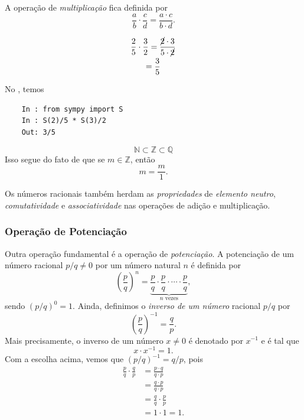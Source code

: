 A operação de \emph{multiplicação} fica definida por
\begin{equation}
  \frac{a}{b}\cdot\frac{c}{d} = \frac{a\cdot c}{b\cdot d}.
\end{equation}

\begin{ex}
  \begin{gather}
    \frac{2}{5}\cdot\frac{3}{2} = \frac{\cancel{2}\cdot 3}{5\cdot \cancel{2}} \\
    = \frac{3}{5}
  \end{gather}

  \ifispython
  No \python, temos
  \begin{lstlisting}
    In : from sympy import S
    In : S(2)/5 * S(3)/2
    Out: 3/5
  \end{lstlisting}
  \fi
\end{ex}

\begin{obs}
  \begin{equation}
    \mathbb{N} \subset \mathbb{Z} \subset \mathbb{Q}
  \end{equation}
  Isso segue do fato de que se $m\in\mathbb{Z}$, então
  \begin{equation}
    m = \frac{m}{1}.
  \end{equation}
  
  Os números racionais também herdam as \emph{propriedades} de \emph{elemento neutro}, \emph{comutatividade} e \emph{associatividade} nas operações de adição e multiplicação.
\end{obs}

\subsubsection{Operação de Potenciação}

Outra operação fundamental é a operação de \emph{potenciação}. A potenciação de um número racional $p/q\neq 0$ por um número natural $n$ é definida por
\begin{equation}
  \left(\frac{p}{q}\right)^n = \underbrace{\frac{p}{q}\cdot\frac{p}{q}\cdot\cdots\cdot\frac{p}{q}}_{n\text{ vezes}},
\end{equation}
sendo $(p/q)^0 = 1$. Ainda, definimos o \emph{inverso de um número} racional $p/q$ por
\begin{equation}
  \left(\frac{p}{q}\right)^{-1} = \frac{q}{p}.
\end{equation}
Mais precisamente, o inverso de um número $x\neq 0$ é denotado por $x^{-1}$ e é tal que
\begin{equation}
  x\cdot x^{-1} = 1.
\end{equation}
Com a escolha acima, vemos que $(p/q)^{-1}=q/p$, pois
\begin{align}
  \frac{p}{q}\cdot\frac{q}{p} &= \frac{p\cdot q}{q\cdot p}\\
                              &= \frac{q\cdot p}{q\cdot p}\\
                              &= \frac{q}{q}\cdot\frac{p}{p}\\
                              &= 1\cdot 1 = 1.
\end{align}

